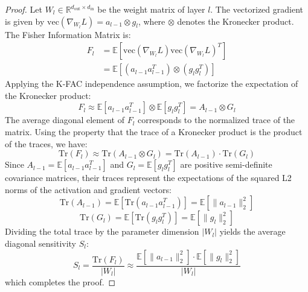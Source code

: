 \documentclass{article}
\theoremstyle{plain}
\theoremstyle{definition}
\theoremstyle{remark}
\begin{document}
\begin{proof}
Let $W_l \in \mathbb{R}^{d_{\text{out}} \times d_{\text{in}}}$ be the weight matrix of layer $l$. The vectorized gradient is given by $\text{vec}(\nabla_{W_l} L) = a_{l-1} \otimes g_l$, where $\otimes$ denotes the Kronecker product. The Fisher Information Matrix is:
\begin{align}
F_l &= \mathbb{E}\left[ \text{vec}(\nabla_{W_l} L) \text{vec}(\nabla_{W_l} L)^T \right] \nonumber \\
&= \mathbb{E}\left[ (a_{l-1} a_{l-1}^T) \otimes (g_l g_l^T) \right]
\end{align}
Applying the K-FAC independence assumption, we factorize the expectation of the Kronecker product:
\begin{equation}
F_l \approx \mathbb{E}[a_{l-1} a_{l-1}^T] \otimes \mathbb{E}[g_l g_l^T] = A_{l-1} \otimes G_l
\end{equation}
The average diagonal element of $F_l$ corresponds to the normalized trace of the matrix. Using the property that the trace of a Kronecker product is the product of the traces, we have:
\begin{equation}
\text{Tr}(F_l) \approx \text{Tr}(A_{l-1} \otimes G_l) = \text{Tr}(A_{l-1}) \cdot \text{Tr}(G_l)
\end{equation}
Since $A_{l-1} = \mathbb{E}[a_{l-1} a_{l-1}^T]$ and $G_l = \mathbb{E}[g_l g_l^T]$ are positive semi-definite covariance matrices, their traces represent the expectations of the squared L2 norms of the activation and gradient vectors:
\begin{equation}
\text{Tr}(A_{l-1}) = \mathbb{E}[\text{Tr}(a_{l-1} a_{l-1}^T)] = \mathbb{E}[\|a_{l-1}\|_2^2]
\end{equation}
\begin{equation}
\text{Tr}(G_l) = \mathbb{E}[\text{Tr}(g_l g_l^T)] = \mathbb{E}[\|g_l\|_2^2]
\end{equation}
Dividing the total trace by the parameter dimension $|W_l|$ yields the average diagonal sensitivity $S_l$:
\begin{equation}
S_l = \frac{\text{Tr}(F_l)}{|W_l|} \approx \frac{\mathbb{E}[\|a_{l-1}\|_2^2] \cdot \mathbb{E}[\|g_l\|_2^2]}{|W_l|}
\end{equation}
which completes the proof.
\end{proof}
\end{document}
